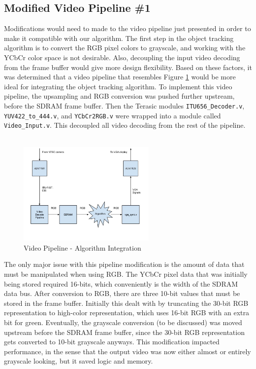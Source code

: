 \documentclass[11pt]{article} %
\begin{document}
\subsection{Modified Video Pipeline \#1}
Modifications would need to made to the video pipeline just presented in order to make it compatible with our algorithm. The first step in the object tracking algorithm is to convert the RGB pixel colors to grayscale, and working with the YCbCr color space is not desirable. Also, decoupling the input video decoding from the frame buffer would give more design flexibility. Based on these factors, it was determined that a video pipeline that resembles Figure \ref{fig:algoPipe} would be more ideal for integrating the object tracking algorithm. To implement this video pipeline, the upsampling and RGB conversion was pushed further upstream, before the SDRAM frame buffer. Then the Terasic modules \texttt{ITU656\_Decoder.v}, \texttt{YUV422\_to\_444.v}, and \texttt{YCbCr2RGB.v} were wrapped into a module called \texttt{Video\_Input.v}. This decoupled all video decoding from the rest of the pipeline. \\\\
\FloatBarrier
\begin{figure}[h]
\centering
\includegraphics[width=0.6\textwidth]{./images/desired_pipeline.jpg}
\caption{Video Pipeline - Algorithm Integration}
\label{fig:algoPipe}
\end{figure}
The only major issue with this pipeline modification is the amount of data that must be manipulated when using RGB. The YCbCr pixel data that was initially being stored required 16-bits, which conveniently is the width of the SDRAM data bus. After conversion to RGB, there are three 10-bit values that must be stored in the frame buffer. Initially this dealt with by truncating the 30-bit RGB representation to high-color representation, which uses 16-bit RGB with an extra bit for green. Eventually, the grayscale conversion (to be discussed) was moved upstream before the SDRAM frame buffer, since the 30-bit RGB representation gets converted to 10-bit grayscale anyways. This modification impacted performance, in the sense that the output video was now either almost or entirely grayscale looking, but it saved logic and memory.
\end{document}
